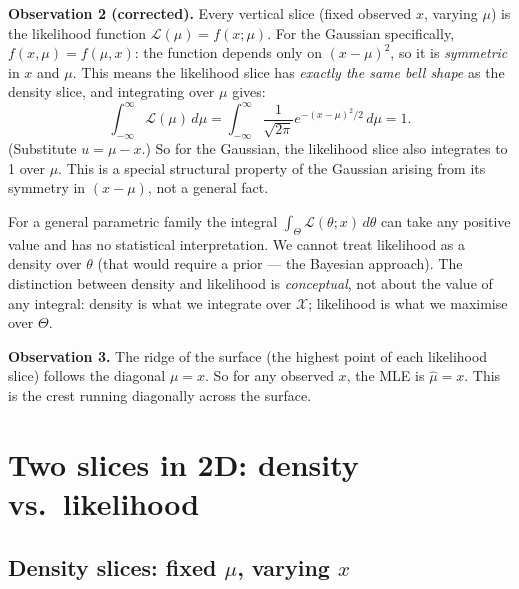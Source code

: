 \documentclass[12pt, a4paper]{article}
\theoremstyle{definition}
\theoremstyle{remark}
\newcommand{\cL}{\mathcal{L}}
\begin{document}
\textbf{Observation 2 (corrected).}
Every vertical slice (fixed observed $x$, varying $\mu$)
is the likelihood function $\cL(\mu) = f(x;\mu)$.
For the Gaussian specifically, $f(x,\mu) = f(\mu,x)$:
the function depends only on $(x-\mu)^2$, so it is
\emph{symmetric} in $x$ and $\mu$.  This means the
likelihood slice has \emph{exactly the same bell shape}
as the density slice, and integrating over $\mu$ gives:
\[
  \int_{-\infty}^\infty \cL(\mu)\,d\mu
  = \int_{-\infty}^\infty \frac{1}{\sqrt{2\pi}}
    e^{-(x-\mu)^2/2}\,d\mu = 1.
\]
(Substitute $u = \mu - x$.)
So for the Gaussian, the likelihood slice also integrates to 1
over $\mu$.  This is a special structural property of the Gaussian
arising from its symmetry in $(x-\mu)$, not a general fact.

For a general parametric family the integral
$\int_\Theta \cL(\theta;x)\,d\theta$ can take any positive value
and has no statistical interpretation.  We cannot treat likelihood
as a density over $\theta$ (that would require a prior --- the
Bayesian approach).  The distinction between density and likelihood
is \emph{conceptual}, not about the value of any integral:
density is what we integrate over $\mathcal{X}$;
likelihood is what we maximise over $\Theta$.

\textbf{Observation 3.}
The ridge of the surface (the highest point of each
likelihood slice) follows the diagonal $\mu = x$.
So for any observed $x$, the MLE is $\hat\mu = x$.
This is the crest running diagonally across the surface.

\section{Two slices in 2D: density vs.\ likelihood}

\subsection{Density slices: fixed $\mu$, varying $x$}
\end{document}
